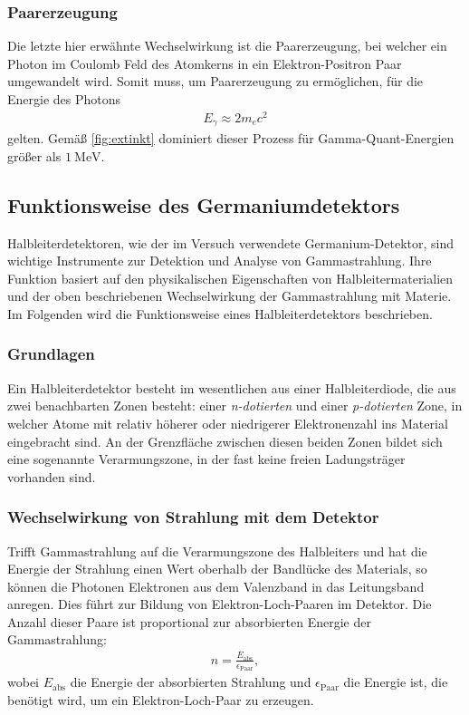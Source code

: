 \subsubsection{Paarerzeugung}
Die letzte hier erwähnte Wechselwirkung ist die Paarerzeugung, bei welcher ein Photon im Coulomb Feld des Atomkerns in ein Elektron-Positron Paar umgewandelt wird.
Somit muss, um Paarerzeugung zu ermöglichen, für die Energie des Photons
\begin{align}
  E_\gamma \approx 2m_ec^2
\end{align}
gelten. Gemäß \autoref{fig:extinkt} dominiert dieser Prozess für Gamma-Quant-Energien größer als $\SI{1}{\mega\eV}$.
\subsection{Funktionsweise des Germaniumdetektors}
Halbleiterdetektoren, wie der im Versuch verwendete Germanium-Detektor, sind wichtige Instrumente zur Detektion und Analyse von Gammastrahlung. Ihre Funktion basiert auf den physikalischen Eigenschaften von Halbleitermaterialien und der oben beschriebenen Wechselwirkung der Gammastrahlung mit Materie. Im Folgenden wird die Funktionsweise eines Halbleiterdetektors beschrieben.

\subsubsection{Grundlagen}
Ein Halbleiterdetektor besteht im wesentlichen aus einer Halbleiterdiode, die aus zwei benachbarten Zonen besteht: einer \textit{n-dotierten} und einer \textit{p-dotierten} Zone, in welcher Atome mit relativ höherer oder niedrigerer Elektronenzahl ins Material eingebracht sind. An der Grenzfläche zwischen diesen beiden Zonen bildet sich eine sogenannte Verarmungszone, in der fast keine freien Ladungsträger vorhanden sind.

\subsubsection{Wechselwirkung von Strahlung mit dem Detektor}
Trifft Gammastrahlung auf die Verarmungszone des Halbleiters und hat die Energie der Strahlung einen Wert oberhalb der Bandlücke des Materials, so können die Photonen Elektronen aus dem Valenzband in das Leitungsband anregen. Dies führt zur Bildung von Elektron-Loch-Paaren im Detektor. Die Anzahl dieser Paare ist proportional zur absorbierten Energie der Gammastrahlung:
\begin{align}
  n = \frac{E_{\text{abs}}}{\epsilon_\text{Paar}},
\end{align}
wobei $E_{\text{abs}}$ die Energie der absorbierten Strahlung und $\epsilon_\text{Paar}$ die Energie ist, die benötigt wird, um ein Elektron-Loch-Paar zu erzeugen.

